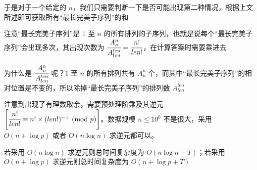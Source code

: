 \documentclass{pptt}
\begin{document}
\begin{frame}
    于是对于一个给定的 $n$，我们只需要判断一下是否可能出现第二种情况，根据上文所述即可获取所有“最长完美子序列”的和

    注意“最长完美子序列”是 $1$ 至 $n$ 的所有排列的子序列，也就是说每个“最长完美子序列”会出现多次，其出现次数为 $\cfrac{A_n^n}{A_{len}^{len}}=\cfrac{n!}{len!}$，在计算答案时需要乘进去

    为什么是 $\cfrac{A_n^n}{A_{len}^{len}}$ 呢？$1$ 至 $n$ 的所有排列共有 $A_n^n$ 个，而其中“最长完美子序列”的相对位置是不变的，所以除掉“最长完美子序列”的排列数 $A_{len}^{len}$

    注意到出现了有理数取余，需要预处理阶乘及其逆元 $\left[ \cfrac{n!}{len!} \equiv n! \times (len!)^{-1} \pmod p \right]$。数据规模 $n \leq {10}^6$ 不是很大，采用 $O(n + \log p)$ 或者 $O(n \log n)$ 求逆元都可以。
    
    若采用 $O(n \log n)$ 求逆元则总时间复杂度为 $O(n \log n + T)$；若采用 $O(n + \log p)$ 求逆元则总时间复杂度为 $O(n + \log p + T)$
\end{frame}
\end{document}
